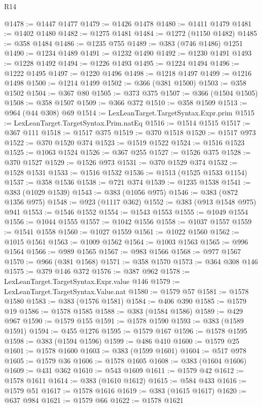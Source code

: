 \begin{lexlean}{R14}
\begin{coremodule}
@1478 := @1447 @1477
@1479 := @1426 @1478
@1480 := @1411 @1479
@1481 := @1402 @1480
@1482 := @1275 @1481
@1484 := @1272 (@1150 @1482)
@1485 := @358 @1484
@1486 := @1235 @755
@1489 := @383 (@746 @1486) @1251
@1490 := @1234 @1489
@1491 := @1232 @1490
@1492 := @1230 @1491
@1493 := @1228 @1492
@1494 := @1226 @1493
@1495 := @1224 @1494
@1496 := @1222 @1495
@1497 := @1220 @1496
@1498 := @1218 @1497
@1499 := @1216 @1498
@1500 := @1214 @1499
@1502 := @366 (@381 @1500)
@1503 := @358 @1502
@1504 := @367 @80
@1505 := @373 @375
@1507 := @366 (@1504 @1505)
@1508 := @358 @1507
@1509 := @366 @372
@1510 := @358 @1509
@1513 := @964 (@44 @308) @69
@1514 := LexLeanTarget.TargetSyntax.Expr.prim
@1515 := LexLeanTarget.TargetSyntax.Prim.natEq
@1516 := @1514 @1515
@1517 := @367 @111
@1518 := @1517 @375
@1519 := @370 @1518
@1520 := @1517 @973
@1522 := @370 @1520 @374
@1523 := @1519 @1522
@1524 := @1516 @1523
@1525 := @1063 @1524
@1526 := @367 @255
@1527 := @1526 @375
@1528 := @370 @1527
@1529 := @1526 @973
@1531 := @370 @1529 @374
@1532 := @1528 @1531
@1533 := @1516 @1532
@1536 := @1513 (@1525 @1533 @1154)
@1537 := @358 @1536
@1538 := @721 @374
@1539 := @1235 @1538
@1541 := @383 (@1029 @1539)
@1543 := @383 (@1056 @975)
@1546 := @383 (@872 @1356 @975)
@1548 := @923 (@1117 @362)
@1552 := @383 (@913 @1548 @975) @941
@1553 := @1546 @1552
@1554 := @1543 @1553
@1555 := @1049 @1554
@1556 := @1044 @1555
@1557 := @1042 @1556
@1558 := @1037 @1557
@1559 := @1541 @1558
@1560 := @1027 @1559
@1561 := @1022 @1560
@1562 := @1015 @1561
@1563 := @1009 @1562
@1564 := @1003 @1563
@1565 := @996 @1564
@1566 := @989 @1565
@1567 := @983 @1566
@1568 := @977 @1567
@1570 := @966 (@381 @1568)
@1571 := @358 @1570
@1573 := @364 @308 @146
@1575 := @379 @146 @372
@1576 := @387 @962
@1578 := LexLeanTarget.TargetSyntax.Expr.value @146
@1579 := LexLeanTarget.TargetSyntax.Value.nat
@1580 := @1579 @57
@1581 := @1578 @1580
@1583 := @383 (@1576 @1581)
@1584 := @406 @390
@1585 := @1579 @19
@1586 := @1578 @1585
@1588 := @383 (@1584 @1586)
@1589 := @429 @967
@1590 := @1579 @155
@1591 := @1578 @1590
@1593 := @383 (@1589 @1591)
@1594 := @455 @1276
@1595 := @1579 @167
@1596 := @1578 @1595
@1598 := @383 (@1594 @1596)
@1599 := @486 @410
@1600 := @1579 @25
@1601 := @1578 @1600
@1603 := @383 (@1599 @1601)
@1604 := @517 @978
@1605 := @1579 @36
@1606 := @1578 @1605
@1608 := @383 (@1604 @1606)
@1609 := @431 @362
@1610 := @543 @1609
@1611 := @1579 @42
@1612 := @1578 @1611
@1614 := @383 (@1610 @1612)
@1615 := @584 @433
@1616 := @1579 @51
@1617 := @1578 @1616
@1619 := @383 (@1615 @1617)
@1620 := @637 @984
@1621 := @1579 @66
@1622 := @1578 @1621

\end{coremodule}
\end{lexlean}
